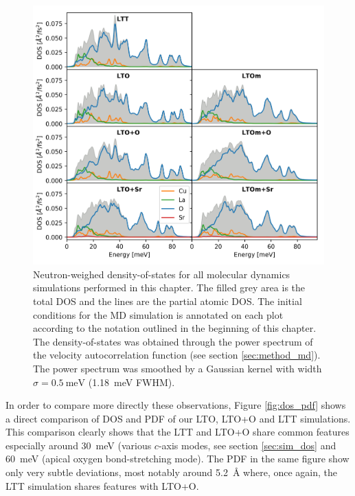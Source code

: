 \begin{figure}
	\centering
	\includegraphics[width=\textwidth]{fig/md/lto_defect_comparison.png}
	\caption[LTO MD DOS: Defect comparison]{Neutron-weighed density-of-states for all molecular dynamics simulations performed in this chapter. The filled grey area is the total DOS and the lines are the partial atomic DOS. The initial conditions for the MD simulation is annotated on each plot according to the notation outlined in the beginning of this chapter. The density-of-states was obtained through the power spectrum of the velocity autocorrelation function (see section \ref{sec:method_md}). The power spectrum was smoothed by a Gaussian kernel with width $\sigma=\SI{0.5}{\milli\eV}$ (\SI{1.18}{\milli\eV} FWHM).}
	\label{fig:lto_md_defect_comparison}
\end{figure}

In order to compare more directly these observations, Figure \ref{fig:dos_pdf} shows a direct comparison of DOS and PDF of our LTO, LTO+O and LTT simulations. This comparison clearly shows that the LTT and LTO+O share common features especially around \SI{30}{\milli\eV} (various $c$-axis modes, see section \ref{sec:sim_dos} and \SI{60}{\milli\eV} (apical oxygen bond-stretching mode). The PDF in the same figure show only very subtle deviations, most notably around \SI{5.2}{\angstrom} where, once again, the LTT simulation shares features with LTO+O.

